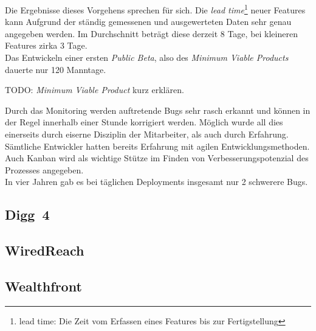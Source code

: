 Die Ergebnisse dieses Vorgehens sprechen für sich. Die \emph{lead
time}\footnote{lead time: Die Zeit vom Erfassen eines Features bis zur
Fertigstellung} neuer Features kann Aufgrund der ständig gemessenen und
ausgewerteten Daten sehr genau angegeben werden. Im Durchschnitt beträgt diese
derzeit 8 Tage, bei kleineren Features zirka 3 Tage.\\
Das Entwickeln einer ersten \emph{Public Beta}, also des \emph{Minimum Viable
Products} dauerte nur 120 Manntage.

\begin{wichtigbox}
TODO: \emph{Minimum Viable Product} kurz erklären.
\end{wichtigbox}

Durch das Monitoring werden auftretende Bugs sehr rasch erkannt und können  in
der Regel innerhalb einer Stunde korrigiert werden. Möglich wurde all dies
einerseits durch eiserne Disziplin der Mitarbeiter, als auch durch Erfahrung.
Sämtliche Entwickler hatten bereits Erfahrung mit agilen Entwicklungsmethoden.
Auch Kanban wird als wichtige Stütze im Finden von Verbesserungspotenzial des
Prozesses angegeben.\\
In vier Jahren gab es bei täglichen Deployments insgesamt nur 2 schwerere
Bugs.


\subsection{Digg~4}

\subsection{WiredReach}

\subsection{Wealthfront}
